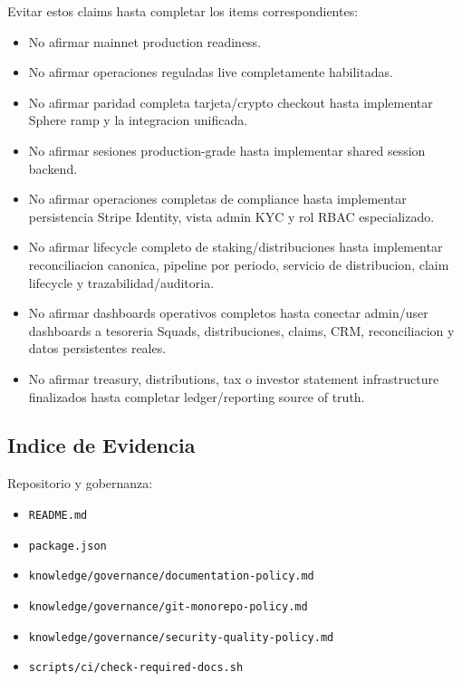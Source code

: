 \documentclass[
  10pt,
  letterpaper,
]{article}
\providecommand{\tightlist}{%
  \setlength{\itemsep}{0pt}\setlength{\parskip}{0pt}}
\let\oldtexttt\texttt
\renewcommand{\texttt}[1]{\oldtexttt{\small #1}}
\begin{document}
Evitar estos claims hasta completar los items correspondientes:

\begin{itemize}
\tightlist
\item
  No afirmar mainnet production readiness.
\item
  No afirmar operaciones reguladas live completamente habilitadas.
\item
  No afirmar paridad completa tarjeta/crypto checkout hasta implementar
  Sphere ramp y la integracion unificada.
\item
  No afirmar sesiones production-grade hasta implementar shared session
  backend.
\item
  No afirmar operaciones completas de compliance hasta implementar
  persistencia Stripe Identity, vista admin KYC y rol RBAC
  especializado.
\item
  No afirmar lifecycle completo de staking/distribuciones hasta
  implementar reconciliacion canonica, pipeline por periodo, servicio de
  distribucion, claim lifecycle y trazabilidad/auditoria.
\item
  No afirmar dashboards operativos completos hasta conectar admin/user
  dashboards a tesoreria Squads, distribuciones, claims, CRM,
  reconciliacion y datos persistentes reales.
\item
  No afirmar treasury, distributions, tax o investor statement
  infrastructure finalizados hasta completar ledger/reporting source of
  truth.
\end{itemize}

\subsection{Indice de Evidencia}\label{indice-de-evidencia}

Repositorio y gobernanza:

\begin{itemize}
\tightlist
\item
  \texttt{README.md}
\item
  \texttt{package.json}
\item
  \texttt{knowledge/governance/documentation-policy.md}
\item
  \texttt{knowledge/governance/git-monorepo-policy.md}
\item
  \texttt{knowledge/governance/security-quality-policy.md}
\item
  \texttt{scripts/ci/check-required-docs.sh}
\end{itemize}
\end{document}
